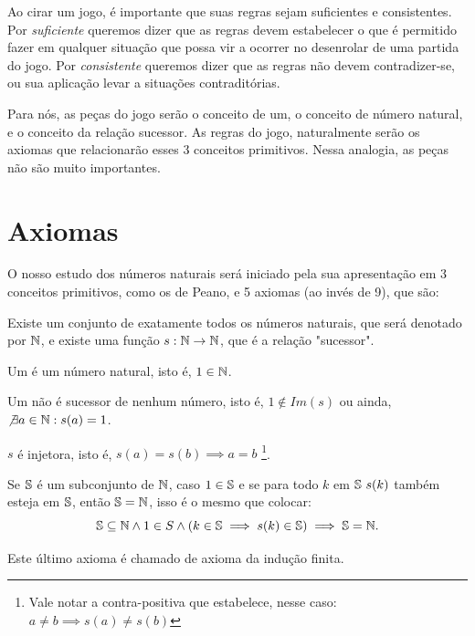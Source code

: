 \documentclass[../main.tex]{subfiles}
\begin{document}
\begin{displayquote} Ao cirar um jogo, é importante que suas regras sejam suficientes e consistentes. Por \emph{suficiente} queremos dizer que as regras devem estabelecer o que é permitido fazer em qualquer situação que possa vir a ocorrer no desenrolar de uma partida do jogo. Por \emph{consistente} queremos dizer que as regras não devem contradizer-se, ou sua aplicação levar a situações contraditórias. \Parencite[p. 13-14]{barbosa}
\end{displayquote}

Para nós, as peças do jogo serão o conceito de um, o conceito de número natural, e o conceito da relação sucessor. As regras do jogo, naturalmente serão os axiomas que relacionarão esses 3 conceitos primitivos. Nessa analogia, as peças não são muito importantes.

\section{Axiomas}
O nosso estudo dos números naturais será iniciado pela sua apresentação em 3 conceitos primitivos, como os de Peano, e 5 axiomas (ao invés de 9), que são:

\begin{axi}\label{axi-existe-n-s}
    Existe um conjunto de exatamente todos os números naturais, que será denotado por $\N$, e existe uma função $s: \N \rightarrow \N$, que é a relação "sucessor". 
\end{axi}
\begin{axi}\label{axi-um-natural}
    Um é um número natural, isto é, $1 \in \N$.
\end{axi}
\begin{axi}\label{axi-um-nao-sucessor}
    Um não é sucessor de nenhum número, isto é, $1 \not \in Im(s)$ ou ainda, $\not \exists a \in \N : s(a) = 1$.
\end{axi}
\begin{axi}\label{axi-s-injetora}
    $s$ é injetora, isto é, $s(a) = s(b) \implies a = b$ \footnote{Vale notar a contra-positiva que estabelece, nesse caso: $a \neq b \implies s(a) \neq s(b)$}.
\end{axi}
\begin{axi}\label{axi-ind-finita}
    Se $\S$ é um subconjunto de $\N$, caso $1 \in \S$ e se para todo $k$ em $\S\ s(k)$ também esteja em $\S$, então $\S = \N$, isso é o mesmo que colocar: \\
     \[ \S \subseteq \N \land 1 \in S \land ( k \in \S \implies s(k) \in \S) \implies \S = \N .\]
\end{axi}
Este último axioma é chamado de axioma da indução finita.
\end{document}
